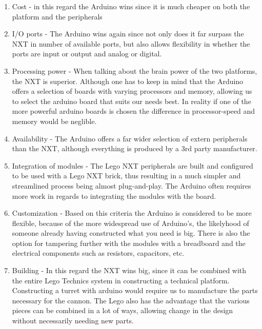 \begin{enumerate}
  \item Cost - in this regard the Arduino wins since it is much cheaper on both the platform and the peripherals
  \item I/O ports - The Arduino wins again since not only does it far surpass the NXT in number of available ports,
  but also allows flexibility in whether the ports are input or output and analog or digital.
  \item Processing power - When talking about the brain power of the two platforms, the NXT is superior. Although one has to
  keep in mind that the Arduino offers a selection of boards with varying processors and memory, allowing us to select the arduino
  board that suits our needs best. In reality if one of the more powerful arduino boards is chosen the difference in processor-speed and memory
  would be neglible.
  \item Availability - The Arduino offers a far wider selection of extern peripherals than the NXT, although everything is produced by a 3rd party manufacturer.
  \item Integration of modules - The Lego NXT peripherals are built and configured to be used with a Lego NXT brick, thus resulting in a much simpler
  and streamlined process being almost plug-and-play. The Arduino often requires more work in regards to integrating the modules with the board.
  \item Customization - Based on this criteria the Arduino is considered to be more flexible, because of the more widespread use of Arduino's, the likelyhood of someone
  already having constructed what you need is big. There is also the option for tampering further with the modules with a breadboard and the electrical components such as resistors, capacitors, etc.
  \item Building - In this regard the NXT wins big, since it can be combined with the entire Lego Technics system in constructing a technical platform. Constructing a turret with arduino would
  require us to manufacture the parts necessary for the cannon. The Lego also has the advantage that the various pieces can be combined in a lot of ways, allowing change in the design without necessarily needing new parts.  
\end{enumerate}
